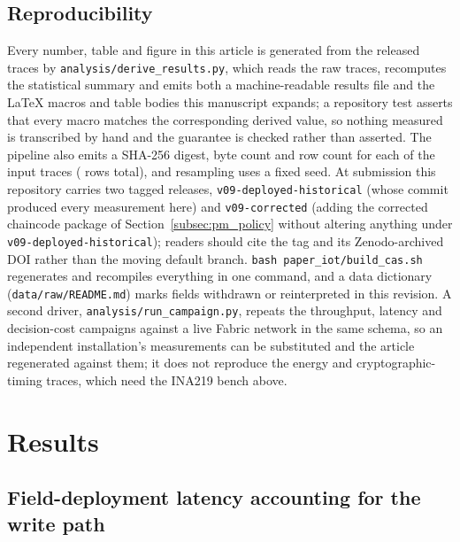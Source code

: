 \documentclass[a4paper,fleqn]{cas-sc}
\begin{document}
\subsection{Reproducibility}
\label{subsec:repro}

Every number, table and figure in this article is generated from the
released traces by \texttt{analysis/derive\_results.py}, which reads the
raw traces, recomputes the statistical summary and emits both a
machine-readable results file and the LaTeX macros and table bodies this
manuscript expands; a repository test asserts that every macro matches the
corresponding derived value, so nothing measured is transcribed by hand
and the guarantee is checked rather than asserted. The pipeline also emits
a SHA-256 digest, byte count and row count for each of the \TraceCount{}
input traces (\TraceRows{} rows total), and resampling uses a fixed seed.
At submission this repository carries two tagged releases,
\texttt{v09-deployed-historical} (whose commit produced every measurement here) and
\texttt{v09-corrected} (adding the corrected chaincode package of
Section~\ref{subsec:pm_policy} without altering anything under
\texttt{v09-deployed-historical}); readers should cite the tag and its Zenodo-archived
DOI rather than the moving default branch. \texttt{bash
paper\_iot/build\_cas.sh} regenerates and recompiles everything in one
command, and a data dictionary (\texttt{data/raw/README.md}) marks fields
withdrawn or reinterpreted in this revision. A second driver,
\texttt{analysis/run\_campaign.py}, repeats the throughput, latency and
decision-cost campaigns against a live Fabric network in the same schema,
so an independent installation's measurements can be substituted and the
article regenerated against them; it does not reproduce the energy and
cryptographic-timing traces, which need the INA219 bench above.

\FloatBarrier
\section{Results}
\label{sec:results}

\subsection{Field-deployment latency accounting for the write path}
\label{subsec:decomposition}
\end{document}
